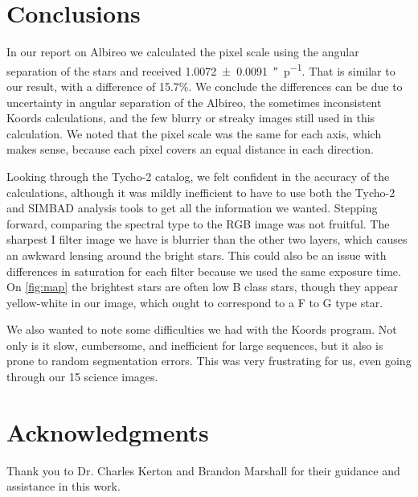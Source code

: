 \documentclass[%
aip,
jmp,
reprint,
floatfix,
nofootinbib
]{revtex4-1}
\begin{document}
	
	


	\section{Conclusions}
	
	In our report on Albireo we calculated the pixel scale using the angular separation of the stars and received \SI{1.0072\pm.0091}{\arcsecond\per p}. That is similar to our result, with a difference of 15.7\%. We conclude the differences can be due to uncertainty in angular separation of the Albireo, the sometimes inconsistent Koords calculations, and the few blurry or streaky images still used in this calculation. We noted that the pixel scale was the same for each axis, which makes sense, because each pixel covers an equal distance in each direction.	
	
	Looking through the Tycho-2 catalog, we felt confident in the accuracy of the calculations, although it was mildly inefficient to have to use both the Tycho-2 and SIMBAD analysis tools to get all the information we wanted. Stepping forward, comparing the spectral type to the RGB image was not fruitful. The sharpest I filter image we have is blurrier than the other two layers, which causes an awkward lensing around the bright stars. This could also be an issue with differences in saturation for each filter because we used the same exposure time. On \autoref{fig:map} the brightest stars are often low B class stars, though they appear yellow-white in our image, which ought to correspond to a F to G type star. 
	
	We also wanted to note some difficulties we had with the Koords program. Not only is it slow, cumbersome, and inefficient for large sequences, but it also is prone to random segmentation errors. This was very frustrating for us, even going through our 15 science images.


	\section*{Acknowledgments}

	Thank you to Dr. Charles Kerton and Brandon Marshall for their guidance and assistance in this work.
	\medskip
	
\end{document}
